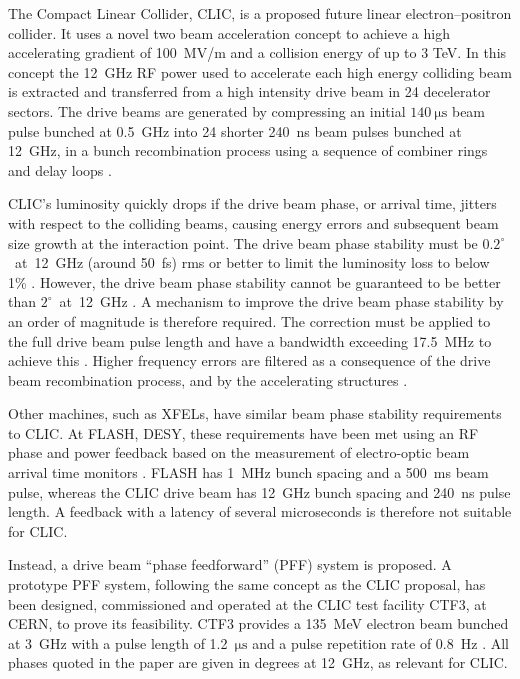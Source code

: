\documentclass[%
 reprint,
 superscriptaddress,
 amsmath,
 amssymb,
 prl,
]{revtex4-1}
\begin{document}
\maketitle

The Compact Linear Collider, CLIC, \cite{CLICCDR} is a proposed future 
linear electron--positron collider. It uses a novel two beam acceleration 
concept to achieve a high accelerating gradient of 100~MV/m 
and a collision energy of up to 3 TeV. In this concept the 12~GHz RF power used 
to accelerate each high energy colliding beam is extracted and transferred from 
a high intensity drive beam in 24 decelerator sectors. The 
drive beams are generated by compressing an initial 
\(140~\mathrm{\mu s}\) beam pulse bunched at 0.5~GHz into 24 shorter 240~ns 
beam pulses bunched at 12~GHz, in a bunch recombination process using a 
sequence of combiner rings and delay loops \cite{CLICCDR}.

CLIC's luminosity quickly drops if the drive beam phase, or arrival time, 
jitters with respect to the colliding beams, causing energy errors and 
subsequent beam size growth at the interaction point. The drive beam phase 
stability must be \(0.2^\circ\)~at~12~GHz (around 50~fs) rms or better to limit 
the luminosity loss to below 1\% \cite{CLICCDR}.  However, the drive beam phase 
stability cannot be guaranteed to be better than \(2^\circ\)~at~12~GHz 
\cite{CLICCDR}. A 
mechanism to improve the drive beam phase stability by an order of magnitude is 
therefore required. The correction must be applied to the full drive beam pulse 
length and have a bandwidth exceeding 17.5~MHz to achieve this 
\cite{Gerber2015}. Higher frequency errors are filtered as a consequence of the 
drive beam recombination process, and by the accelerating structures 
\cite{Gerber2015}.

Other machines, such as XFELs, have similar beam phase stability 	
requirements to CLIC. At FLASH, DESY, these requirements have been met using 
an RF phase and power feedback based on the measurement of electro-optic beam 
arrival time monitors \cite{flashPRL}. 
FLASH has 1~MHz bunch spacing and a 500~ms beam pulse, whereas the CLIC drive 
beam has 12~GHz bunch spacing and 240~ns pulse length. A feedback with a 
latency of several microseconds is therefore not suitable for CLIC.

Instead, a drive beam ``phase feedforward'' (PFF) 
system is proposed. A prototype PFF system, following the same concept as the 
CLIC proposal, has been designed, commissioned and operated at 
the CLIC test facility CTF3, at CERN, to prove its feasibility. CTF3 provides a 
135~MeV electron beam bunched at 3~GHz with a pulse length of 1.2~\(\mathrm{\mu 
s}\) and a pulse repetition rate of 0.8~Hz \cite{CLICCDR}. All phases quoted in 
the paper are given in degrees at 12~GHz, as relevant for CLIC.
\end{document}
